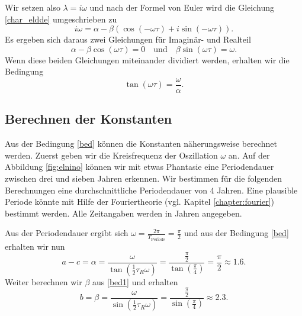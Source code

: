 Wir setzen also $\lambda = i\omega$ und nach der Formel von Euler wird die Gleichung \eqref{char_eldde} umgeschrieben zu 
\begin{equation}
	 i\omega = \alpha-\beta(\cos(-\omega \tau)+i\sin(-\omega \tau)).
\end{equation}
Es ergeben sich daraus zwei Gleichungen für Imaginär- und Realteil
\begin{equation} \label{bed1}
  	\alpha-\beta\cos(\omega \tau) = 0 \quad\text{und}\quad \beta\sin(\omega\tau)=\omega.
\end{equation}
Wenn diese beiden Gleichungen miteinander dividiert werden, erhalten wir die Bedingung
\begin{equation} \label{bed}
	\tan(\omega\tau)=\frac{\omega}{\alpha}.
\end{equation}
 
\subsection{Berechnen der Konstanten}
Aus der Bedingung \eqref{bed} können die Konstanten näherungsweise berechnet werden.
Zuerst geben wir die Kreisfrequenz der Oszillation $\omega$ an. 
Auf der Abbildung \ref{fig:elnino} können wir mit etwas Phantasie eine Periodendauer zwischen drei und sieben Jahren erkennen.
Wir bestimmen für die folgenden Berechnungen eine durchschnittliche Periodendauer von 4 Jahren. 
Eine plausible Periode könnte mit Hilfe der Fouriertheorie (vgl. Kapitel \ref{chapter:fourier}) bestimmt werden.
Alle Zeitangaben werden in Jahren angegeben.

Aus der Periodendauer ergibt sich $\omega = \frac{2\pi}{T_\text{Periode}} = \frac{\pi}{2}$ und aus der Bedingung \eqref{bed} erhalten wir nun 
\begin{equation}
	a-c=\alpha=\frac{\omega}{\tan(\frac{1}{2}\tau_R \omega)}=\frac{\frac{\pi}{2}}{\tan(\frac{\pi}{4})}=\frac{\pi}{2}\approx 1.6.
\end{equation}
Weiter berechnen wir $\beta$ aus \eqref{bed1} und erhalten
\begin{equation}
	b=\beta=\frac{\omega}{\sin(\frac{1}{2}\tau_R \omega)}=\frac{\frac{\pi}{2}}{\sin(\frac{\pi}{4})}\approx 2.3.
\end{equation}

